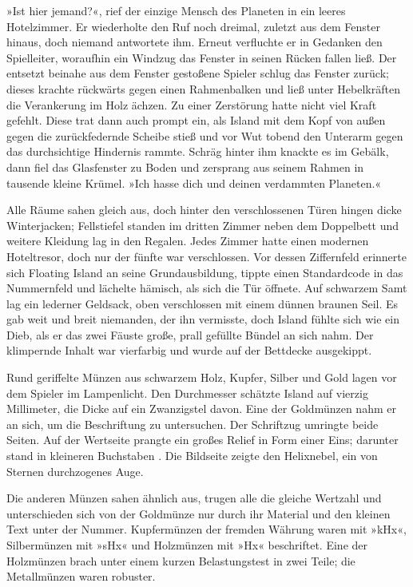»Ist hier jemand?«, rief der einzige Mensch des Planeten in ein leeres Hotelzimmer. Er wiederholte den Ruf noch dreimal, zuletzt aus dem Fenster hinaus, doch niemand antwortete ihm. Erneut verfluchte er in Gedanken den Spielleiter, woraufhin ein Windzug das Fenster in seinen Rücken fallen ließ. Der entsetzt beinahe aus dem Fenster gestoßene Spieler schlug das Fenster zurück; dieses krachte rückwärts gegen einen Rahmenbalken und ließ unter Hebelkräften die Verankerung im Holz ächzen. Zu einer Zerstörung hatte nicht viel Kraft gefehlt. Diese trat dann auch prompt ein, als Island mit dem Kopf von außen gegen die zurückfedernde Scheibe stieß und vor Wut tobend den Unterarm gegen das durchsichtige Hindernis rammte. Schräg hinter ihm knackte es im Gebälk, dann fiel das Glasfenster zu Boden und zersprang aus seinem Rahmen in tausende kleine Krümel. »Ich hasse dich und deinen verdammten Planeten.«

Alle Räume sahen gleich aus, doch hinter den verschlossenen Türen hingen dicke Winterjacken; Fellstiefel standen im dritten Zimmer neben dem Doppelbett und weitere Kleidung lag in den Regalen. Jedes Zimmer hatte einen modernen Hoteltresor, doch nur der fünfte war verschlossen. Vor dessen Ziffernfeld erinnerte sich Floating Island an seine Grundausbildung, tippte einen Standardcode in das Nummernfeld und lächelte hämisch, als sich die Tür öffnete. Auf schwarzem Samt lag ein lederner Geldsack, oben verschlossen mit einem dünnen braunen Seil. Es gab weit und breit niemanden, der ihn vermisste, doch Island fühlte sich wie ein Dieb, als er das zwei Fäuste große, prall gefüllte Bündel an sich nahm. Der klimpernde Inhalt war vierfarbig und wurde auf der Bettdecke ausgekippt.

Rund geriffelte Münzen aus schwarzem Holz, Kupfer, Silber und Gold lagen vor dem Spieler im Lampenlicht. Den Durchmesser schätzte Island auf vierzig Millimeter, die Dicke auf ein Zwanzigstel davon. Eine der Goldmünzen nahm er an sich, um die Beschriftung zu untersuchen. Der Schriftzug  umringte beide Seiten. Auf der Wertseite prangte ein großes Relief in Form einer Eins; darunter stand in kleineren Buchstaben . Die Bildseite zeigte den Helixnebel, ein von Sternen durchzogenes Auge.

Die anderen Münzen sahen ähnlich aus, trugen alle die gleiche Wertzahl und unterschieden sich von der Goldmünze nur durch ihr Material und den kleinen Text unter der Nummer. Kupfermünzen der fremden Währung waren mit »kHx«, Silbermünzen mit »sHx« und Holzmünzen mit »Hx« beschriftet. Eine der Holzmünzen brach unter einem kurzen Belastungstest in zwei Teile; die Metallmünzen waren robuster.

